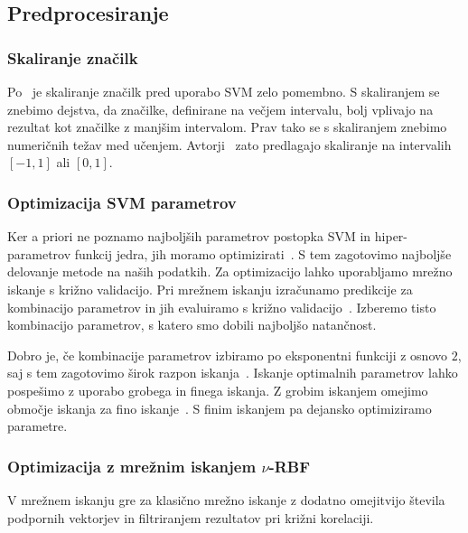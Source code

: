 {\subsection{Predprocesiranje}
\subsubsection{Skaliranje značilk}

Po~\cite{hsu2003practical} je skaliranje značilk pred uporabo SVM zelo pomembno. S skaliranjem se znebimo dejstva, da značilke, definirane na večjem intervalu, bolj vplivajo na rezultat kot značilke z manjšim intervalom. Prav tako se s skaliranjem znebimo numeričnih težav med učenjem. Avtorji~\cite{hsu2003practical} zato predlagajo skaliranje na intervalih $[-1, 1]$ ali $[0, 1]$.







\subsubsection{Optimizacija SVM parametrov}\label{sec:optimizacija-svm-parametrov}

Ker a priori ne poznamo najboljših parametrov postopka SVM in hiper-parametrov funkcij jedra, jih moramo optimizirati~\cite{hsu2003practical}. S tem zagotovimo najboljše delovanje metode na naših podatkih. Za optimizacijo lahko uporabljamo mrežno iskanje s križno validacijo.  Pri mrežnem iskanju izračunamo predikcije za kombinacijo parametrov in jih evaluiramo s križno validacijo~\cite{hsu2003practical}. Izberemo tisto kombinacijo parametrov, s katero smo dobili najboljšo natančnost. 

Dobro je, če kombinacije parametrov izbiramo po eksponentni funkciji z osnovo $2$, saj s tem zagotovimo širok razpon iskanja~\cite{hsu2003practical}. Iskanje optimalnih parametrov lahko pospešimo z uporabo grobega in finega iskanja. Z grobim iskanjem omejimo območje iskanja za fino iskanje~\cite{hsu2003practical}. S finim iskanjem pa dejansko optimiziramo parametre.


\subsubsection{Optimizacija z mrežnim iskanjem \texorpdfstring{$\nu$}{nu}-RBF}\label{sec:nurbf}
V mrežnem iskanju \nurbf gre za klasično mrežno iskanje z dodatno omejitvijo števila podpornih vektorjev in filtriranjem rezultatov pri križni korelaciji.

}
